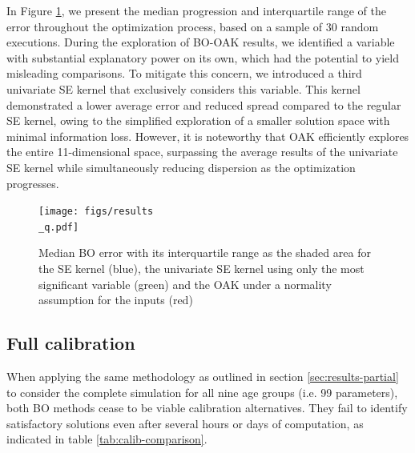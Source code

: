 \documentclass[sn-mathphys,Numbered]{sn-jnl}%
\begin{document}
In Figure \ref{fig:results_oak}, we present the median progression and interquartile range of the error throughout the optimization process, based on a sample of 30 random executions.  During the exploration of BO-OAK results, we identified a variable with substantial explanatory power on its own, which had the potential to yield misleading comparisons. To mitigate this concern, we introduced a third univariate SE kernel that exclusively considers this variable. This kernel demonstrated a lower average error and reduced spread compared to the regular SE kernel, owing to the simplified exploration of a smaller solution space with minimal information loss. However, it is noteworthy that OAK efficiently explores the entire 11-dimensional space, surpassing the average results of the univariate SE kernel while simultaneously reducing dispersion as the optimization progresses.

\begin{figure}[h!]
	\centering	
	\texttt{[image: figs/results\\\_q.pdf]}		
	\caption{Median BO error with its interquartile range as the shaded area for the SE kernel (blue), the univariate SE kernel using only the most significant variable (green) and the OAK under a normality assumption for the inputs (red)}
	\label{fig:results_oak}	
\end{figure}

\subsection{Full calibration}
When applying the same methodology as outlined in section \ref{sec:results-partial} to consider the complete simulation for all nine age groups (i.e. 99 parameters), both BO methods cease to be viable calibration alternatives. They fail to identify satisfactory solutions even after several hours or days of computation, as indicated in table \ref{tab:calib-comparison}.
\end{document}
